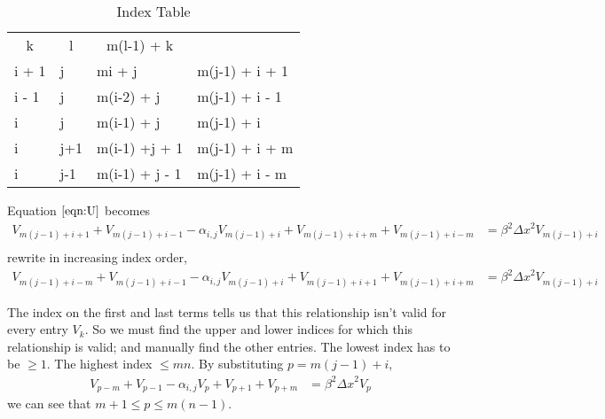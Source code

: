 \documentclass[letter]{article}
\begin{document}
	\begin{table}[h]
	\centering
	\caption{Index Table}
	\label{index_table}
	\begin{tabular}{llll}
	\multicolumn{1}{c}{k} & \multicolumn{1}{c}{l} & \multicolumn{1}{c}{m(l-1) + k}      & \multicolumn{1}{c}{} \\ \cline{1-3}
	i + 1                 & j                     & \multicolumn{1}{l|}{mi + j}			 	& m(j-1) + i + 1       \\
	i - 1                 & j                     & \multicolumn{1}{l|}{m(i-2) + j} 		& m(j-1) + i - 1       \\
	i                     & j                  	  & \multicolumn{1}{l|}{m(i-1) + j}     	& m(j-1) + i          \\
	i                     & j+1                   & \multicolumn{1}{l|}{m(i-1) +j + 1}      & m(j-1) + i + m\\
	i                     & j-1                   & \multicolumn{1}{l|}{m(i-1) + j - 1}     & m(j-1) + i - m  \\
	\end{tabular}
	\end{table}
	
	Equation $\ref{eqn:U}$ becomes\\
	\begin{align*}
		V_{m(j-1) + i + 1} + V_{ m(j-1) + i - 1} - \alpha_{i,j} V_{m(j-1) + i} + V_{m(j-1) + i + m} + V_{m(j-1) + i - m} &= \beta^2 {\Delta x}^2 V_{m(j-1) + i }\\
	\end{align*}
	rewrite in increasing index order,\\
	\begin{align}
		\label{eqn:V}
		V_{m(j-1) + i -m} + V_{ m(j-1) + i - 1} - \alpha_{i,j} V_{m(j-1) + i} + V_{m(j-1) + i + 1} + V_{m(j-1) + i + m} &= \beta^2 {\Delta x}^2 V_{m(j-1) + i }
	\end{align}
	
	The index on the first and last terms tells us that this relationship isn't valid for every entry $V_k$. So we must find the upper and lower indices for which this relationship is valid; and manually find the other entries. The lowest index has to be $\geq 1$. The highest index $\leq mn$. By substituting $p=m(j-1) + i$,\\
	\begin{align}
		V_{p - m} + V_{p - 1} - \alpha_{i,j} V_{p} + V_{p + 1} + V_{p + m} &= \beta^2 {\Delta x}^2 V_{p}
		\label{eqn:V_p}
	\end{align}
	we can see that $m+1 \leq p \leq m(n-1)$.\\
	
\end{document}
